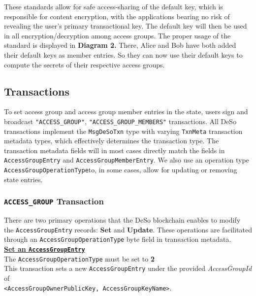 \documentclass[oneside, 12pt]{article}
\newcommand{\ctexttt}[1]{\colorbox{cverbbg}{\texttt{#1}}}
\begin{document}
\noindent These standards allow for safe access-sharing of the default key, which is responsible for content encryption, with the applications bearing no risk of revealing the user’s primary transactional key. The default key will then be used in all encryption/decryption among access groups. The proper usage of the standard is displayed in \textbf{Diagram 2.} There, Alice and Bob have both added their default keys as member entries. So they can now use their default keys to compute the secrets of their respective access groups.

\subsection{Transactions}
To set access group and access group member entries in the state, users sign and broadcast \texttt{"ACCESS\_GROUP"}, \texttt{"ACCESS\_GROUP\_MEMBERS"} transactions. All DeSo transactions implement the \texttt{MsgDeSoTxn} type with varying \texttt{TxnMeta} transaction metadata types, which effectively determines the transaction type. The transaction metadata fields will in most cases directly match the fields in \texttt{AccessGroupEntry} and \texttt{AccessGroupMemberEntry}. We also use an operation type \texttt{AccessGroupOperationType}to, in some cases, allow for updating or removing state entries.

\subsubsection{\texttt{ACCESS\_GROUP} Transaction}
There are two primary operations that the DeSo blockchain enables to modify the \texttt{AccessGroupEntry} records: \textbf{Set} and \textbf{Update}. These operations are facilitated through an  \texttt{AccessGroupOperationType} byte field in transaction metadata.\\

\noindent\underline{\textbf{Set an \texttt{AccessGroupEntry}}}\\
The \ctexttt{AccessGroupOperationType} must be set to \textbf{2}\\
\noindent This transaction sets a new \texttt{AccessGroupEntry} under the provided \textit{AccessGroupId} of \\\texttt{<AccessGroupOwnerPublicKey, AccessGroupKeyName>}.
\end{document}
